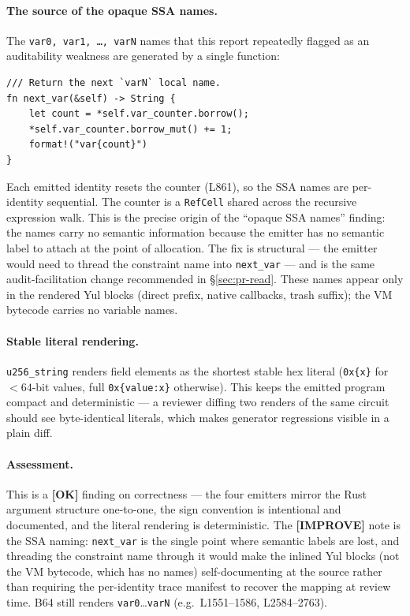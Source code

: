 \paragraph{The source of the opaque SSA names.}
The \texttt{var0, var1, \ldots, varN} names that this report
repeatedly flagged as an auditability weakness are generated by a
single function:
\begin{lstlisting}[style=rust]
/// Return the next `varN` local name.
fn next_var(&self) -> String {
    let count = *self.var_counter.borrow();
    *self.var_counter.borrow_mut() += 1;
    format!("var{count}")
}
\end{lstlisting}
Each emitted identity resets the counter (L861), so the SSA names
are per-identity sequential. The counter is a \texttt{RefCell}
shared across the recursive expression walk. This is the precise
origin of the ``opaque SSA names'' finding: the names carry no
semantic information because the emitter has no semantic label to
attach at the point of allocation. The fix is structural --- the
emitter would need to thread the constraint name into
\texttt{next\_var} --- and is the same audit-facilitation change
recommended in §\ref{sec:pr-read}. These names appear only in
the rendered Yul blocks (direct prefix, native callbacks, trash
suffix); the VM bytecode carries no variable names.

\paragraph{Stable literal rendering.}
\texttt{u256\_string} renders field elements as the shortest
stable hex literal (\texttt{0x\{x\}} for $<64$-bit values, full
\texttt{0x\{value:x\}} otherwise). This keeps the emitted program
compact and deterministic --- a reviewer diffing two renders of the
same circuit should see byte-identical literals, which makes
generator regressions visible in a plain diff.

\paragraph{Assessment.} This is a
\textcolor{tracegreen}{\textbf{[OK]}} finding on correctness ---
the four emitters mirror the Rust argument structure one-to-one,
the sign convention is intentional and documented, and the literal
rendering is deterministic. The
\textcolor{codegenblue}{\textbf{[IMPROVE]}} note is the SSA
naming: \texttt{next\_var} is the single point where semantic
labels are lost, and threading the constraint name through it would
make the inlined Yul blocks (not the VM bytecode, which has no
names) self-documenting at the source rather than requiring the
per-identity trace manifest to recover the mapping at review
time.  B64 still renders
\texttt{var0}\ldots\texttt{varN} (e.g.\ L1551--1586,
L2584--2763).

